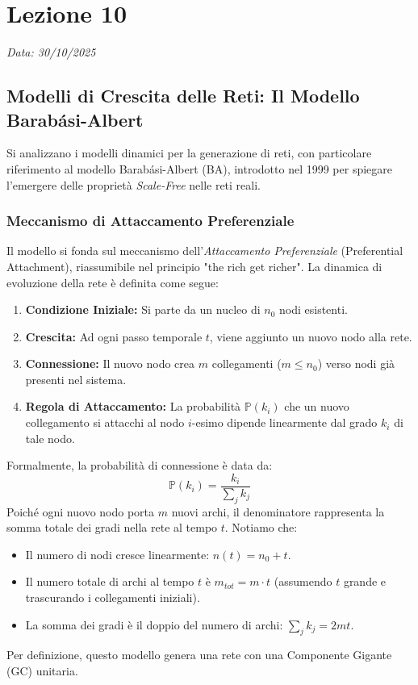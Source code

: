 \chapter{Lezione 10}
\label{chap:lezione_10} 

\begin{flushright}
\textit{Data: 30/10/2025}
\end{flushright}

\section{Modelli di Crescita delle Reti: Il Modello Barabási-Albert}

Si analizzano i modelli dinamici per la generazione di reti, con particolare riferimento al modello Barabási-Albert (BA), introdotto nel 1999 per spiegare l'emergere delle proprietà \textit{Scale-Free} nelle reti reali.

\subsection{Meccanismo di Attaccamento Preferenziale}

Il modello si fonda sul meccanismo dell'\textit{Attaccamento Preferenziale} (Preferential Attachment), riassumibile nel principio "the rich get richer". 
La dinamica di evoluzione della rete è definita come segue:
\begin{enumerate}
    \item \textbf{Condizione Iniziale:} Si parte da un nucleo di $n_0$ nodi esistenti.
    \item \textbf{Crescita:} Ad ogni passo temporale $t$, viene aggiunto un nuovo nodo alla rete.
    \item \textbf{Connessione:} Il nuovo nodo crea $m$ collegamenti ($m \le n_0$) verso nodi già presenti nel sistema.
    \item \textbf{Regola di Attaccamento:} La probabilità $\mathbb{P}(k_i)$ che un nuovo collegamento si attacchi al nodo $i$-esimo dipende linearmente dal grado $k_i$ di tale nodo.
\end{enumerate}

Formalmente, la probabilità di connessione è data da:
\begin{equation}
    \mathbb{P}(k_i) = \frac{k_i}{\sum_j k_j}
\end{equation}
Poiché ogni nuovo nodo porta $m$ nuovi archi, il denominatore rappresenta la somma totale dei gradi nella rete al tempo $t$. 
Notiamo che:
\begin{itemize}
    \item Il numero di nodi cresce linearmente: $n(t) = n_0 + t$.
    \item Il numero totale di archi al tempo $t$ è $m_{tot} = m \cdot t$ (assumendo $t$ grande e trascurando i collegamenti iniziali).
    \item La somma dei gradi è il doppio del numero di archi: $\sum_j k_j = 2 m t$.
\end{itemize}
Per definizione, questo modello genera una rete con una Componente Gigante (GC) unitaria.

